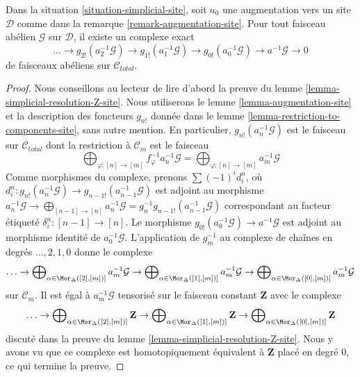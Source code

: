 \begin{lemma}
\label{lemma-simplicial-resolution-augmentation}
Dans la situation \ref{situation-simplicial-site}, soit
$a_0$ une augmentation vers un site $\mathcal{D}$
comme dans la remarque \ref{remark-augmentation-site}.
Pour tout faisceau abélien $\mathcal{G}$ sur $\mathcal{D}$,
il existe un complexe exact
$$
\ldots \to
g_{2!}(a_2^{-1}\mathcal{G}) \to
g_{1!}(a_1^{-1}\mathcal{G}) \to
g_{0!}(a_0^{-1}\mathcal{G}) \to
a^{-1}\mathcal{G} \to 0
$$
de faisceaux abéliens sur $\mathcal{C}_{total}$.
\end{lemma}

\begin{proof}
Nous conseillons au lecteur de lire d'abord la preuve du
lemme \ref{lemma-simplicial-resolution-Z-site}.
Nous utiliserons le lemme \ref{lemma-augmentation-site} et
la description des foncteurs $g_{n!}$ donnée dans le
lemme \ref{lemma-restriction-to-components-site}, sans autre mention.
En particulier, $g_{n!}(a_n^{-1}\mathcal{G})$ est le
faisceau sur $\mathcal{C}_{total}$ dont la restriction à $\mathcal{C}_m$
est le faisceau
$$
\bigoplus\nolimits_{\varphi : [n] \to [m]} f_\varphi^{-1}a_n^{-1}\mathcal{G} =
\bigoplus\nolimits_{\varphi : [n] \to [m]} a_m^{-1}\mathcal{G}
$$
Comme morphismes du complexe, prenons $\sum (-1)^i d^n_i$, où
$d^n_i : g_{n!}(a_n^{-1}\mathcal{G}) \to g_{n - 1!}(a_{n - 1}^{-1}\mathcal{G})$
est adjoint au morphisme
$a_n^{-1}\mathcal{G} \to \bigoplus_{[n - 1] \to [n]} a_n^{-1}\mathcal{G} =
g_n^{-1}g_{n - 1!}(a_{n - 1}^{-1}\mathcal{G})$
correspondant au facteur étiqueté $\delta^n_i : [n - 1] \to [n]$.
Le morphisme $g_{0!}(a_0^{-1}\mathcal{G}) \to a^{-1}\mathcal{G}$ est adjoint
au morphisme identité de $a_0^{-1}\mathcal{G}$.
L'application de $g_m^{-1}$ au complexe de chaînes en degrés
$\ldots, 2, 1, 0$ donne le complexe
$$
\ldots \to
\bigoplus\nolimits_{\alpha \in \Mor_\Delta([2], [m])]} a_m^{-1}\mathcal{G} \to
\bigoplus\nolimits_{\alpha \in \Mor_\Delta([1], [m])]} a_m^{-1}\mathcal{G} \to
\bigoplus\nolimits_{\alpha \in \Mor_\Delta([0], [m])]} a_m^{-1}\mathcal{G}
$$
sur $\mathcal{C}_m$. Il est égal à $a_m^{-1}\mathcal{G}$
tensorisé sur le faisceau constant $\mathbf{Z}$ avec le complexe
$$
\ldots \to
\bigoplus\nolimits_{\alpha \in \Mor_\Delta([2], [m])]} \mathbf{Z} \to
\bigoplus\nolimits_{\alpha \in \Mor_\Delta([1], [m])]} \mathbf{Z} \to
\bigoplus\nolimits_{\alpha \in \Mor_\Delta([0], [m])]} \mathbf{Z}
$$
discuté dans la preuve du lemme \ref{lemma-simplicial-resolution-Z-site}.
Nous y avons vu que ce complexe est homotopiquement équivalent à
$\mathbf{Z}$ placé en degré $0$, ce qui termine la preuve.
\end{proof}

